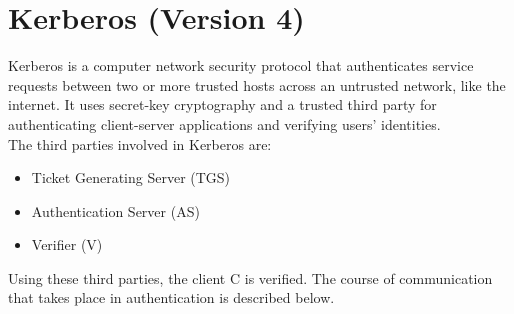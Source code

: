 \documentclass[11pt]{article}
\begin{document}
\section{Kerberos (Version 4)}
Kerberos is a computer network security protocol that authenticates service requests between two or more trusted hosts across an untrusted network, like the internet. It uses secret-key cryptography and a trusted third party for authenticating client-server applications and verifying users' identities.\\
\newline
The third parties involved in Kerberos are:
\begin{itemize}
    \item Ticket Generating Server (TGS)
    \item Authentication Server (AS)
    \item Verifier (V)
\end{itemize}
Using these third parties, the client C is verified. The course of communication that takes place in authentication is described below.
\end{document}
